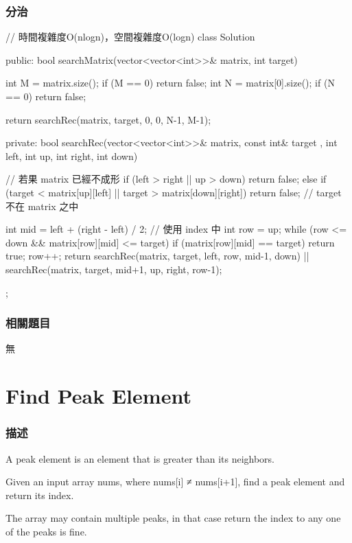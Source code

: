\subsubsection{分治}
\begin{Code}
// 時間複雜度O(nlogn)，空間複雜度O(logn)
class Solution {
public:
    bool searchMatrix(vector<vector<int>>& matrix, int target) {
        int M = matrix.size();
        if (M == 0) return false;
        int N = matrix[0].size();
        if (N == 0) return false;

        return searchRec(matrix, target, 0, 0, N-1, M-1);
    }
private:
    bool searchRec(vector<vector<int>>& matrix, const int& target
                   , int left, int up, int right, int down)
    {
        // 若果 matrix 已經不成形
        if (left > right || up > down)
            return false;
        else if (target < matrix[up][left] || target > matrix[down][right])
            return false; //  target 不在 matrix 之中

        int mid = left + (right - left) / 2; // 使用 index 中
        int row = up;
        while (row <= down && matrix[row][mid] <= target)
        {
            if (matrix[row][mid] == target)
                return true;
            row++;
        }
        return searchRec(matrix, target, left, row, mid-1, down)
            || searchRec(matrix, target, mid+1, up, right, row-1);
    }
};
\end{Code}

\subsubsection{相關題目}
\begindot
\item 無
\myenddot

\section{Find Peak Element} %
\label{sec:find-peadk-element}


\subsubsection{描述}
A peak element is an element that is greater than its neighbors.

Given an input array nums, where nums[i] ≠ nums[i+1], find a peak element and return its index.

The array may contain multiple peaks, in that case return the index to any one of the peaks is fine.

